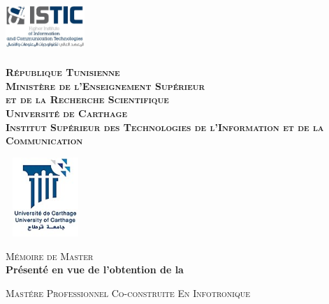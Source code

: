 \begin{titlepage}

\newcommand{\HRule}{\rule{\linewidth}{0.5mm}} %

\center %
 


\begin{minipage}[l]{0.2\columnwidth}
\includegraphics[width=3cm,height=2cm]{logo_istic.jpg}\\
\end{minipage}
\hfill
\begin{minipage}[l]{0.5\columnwidth}
\centering
\footnotesize
\textbf{\textsc{République Tunisienne}}\\
\textbf{\textsc{Ministère de l'Enseignement Supérieur\\
et de la Recherche Scientifique}}\\
\medskip 
\textbf{\textsc{Université de Carthage}}\\
\medskip 
\textbf{\textsc{Institut Supérieur des Technologies de l'Information et de la Communication}}
\end{minipage}
\hfill
\begin{minipage}[l]{0.2\columnwidth}
\includegraphics[width=3cm,height=3cm]{universite-carthage.jpg}\\
\end{minipage}

\vskip1cm
\textsc{\large Mémoire de Master}\\[0.5cm] %

\textbf{Présenté en vue de l'obtention de la}

\textsc{\large Mastére Professionnel Co-construite En Infotronique
}\\[0.5cm] %


\end{titlepage}
